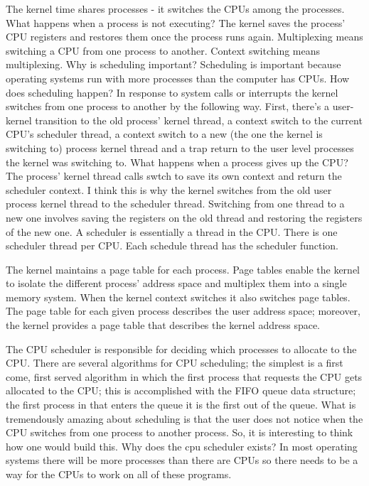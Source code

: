 \documentclass{amsbook}
\begin{document}
The kernel time shares processes - it switches the CPUs among the processes. What happens when a process is not executing? The kernel saves the process' CPU registers and restores them once the process runs again. Multiplexing means switching a CPU from one process to another. Context switching means multiplexing. Why is scheduling important? Scheduling is important because operating systems run with more processes than the computer has CPUs. How does scheduling happen? In response to system calls or interrupts the kernel switches from one process to another by the following way. First, there's a user-kernel transition to the old process' kernel thread, a context switch to the current CPU's scheduler thread, a context switch to a new (the one the kernel is switching to) process kernel thread and a trap return to the user level processes the kernel was switching to. What happens when a process gives up the CPU? The process' kernel thread calls swtch to save its own context and return the scheduler context. I think this is why the kernel switches from the old user process kernel thread to the scheduler thread. Switching from one thread to a new one involves saving the registers on the old thread and restoring the registers of the new one. A scheduler is essentially a thread in the CPU. There is one scheduler thread per CPU. Each schedule thread has the scheduler function.

The kernel maintains a page table for each process. Page tables enable the kernel to isolate the different process' address space and multiplex them into a single memory system. When the kernel context switches it also switches page tables. The page table for each given process describes the user address space; moreover, the kernel provides a page table that describes the kernel address space.


The CPU scheduler is responsible for deciding which processes to allocate to the CPU. There are several algorithms for CPU scheduling; the simplest is a first come, first served algorithm in which the first process that requests the CPU gets allocated to the CPU; this is accomplished with the FIFO queue data structure; the first process in that enters the queue it is the first out of the queue. What is tremendously amazing about scheduling is that the user does not notice when the CPU switches from one process to another process. So, it is interesting to think how one would build this. Why does the cpu scheduler exists? In most operating systems there will be more processes than there are CPUs so there needs to be a way for the CPUs to work on all of these programs. 
\end{document}
